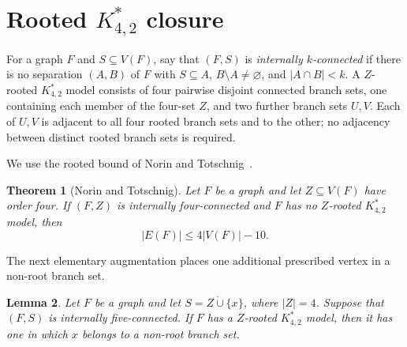 \documentclass[11pt]{amsart}
\newtheorem{theorem}{Theorem}[section]
\newtheorem{lemma}[theorem]{Lemma}
\begin{document}
\section[Rooted-model closure]{Rooted
\texorpdfstring{$K^*_{4,2}$}{K-star(4,2)} closure}

For a graph $F$ and $S\subseteq V(F)$, say that $(F,S)$ is
\emph{internally $k$-connected} if there is no separation $(A,B)$ of $F$
with $S\subseteq A$, $B\setminus A\ne\varnothing$, and
$|A\cap B|<k$.  A $Z$-rooted $K^*_{4,2}$ model consists of four pairwise
disjoint connected branch sets, one containing each member of the four-set
$Z$, and two further branch sets $U,V$.  Each of $U,V$ is adjacent to all
four rooted branch sets and to the other; no adjacency between distinct
rooted branch sets is required.

We use the rooted bound of Norin and
Totschnig~\cite[Lemma~12]{NorinTotschnig2025}.

\begin{theorem}[Norin and Totschnig]
\label{thm:rooted-two-helper-bound}
Let $F$ be a graph and let $Z\subseteq V(F)$ have order four.  If $(F,Z)$
is internally four-connected and $F$ has no $Z$-rooted $K^*_{4,2}$ model,
then
\[
        |E(F)|\leq4|V(F)|-10.                            \tag{4.1}
\]
\end{theorem}

The next elementary augmentation places one additional prescribed vertex
in a non-root branch set.

\begin{lemma}\label{lem:fifth-root-helper}
Let $F$ be a graph and let $S=Z\mathbin{\dot\cup}\{x\}$, where $|Z|=4$.
Suppose that $(F,S)$ is internally five-connected.  If $F$ has a
$Z$-rooted $K^*_{4,2}$ model, then it has one in which $x$ belongs to a
non-root branch set.
\end{lemma}
\end{document}
